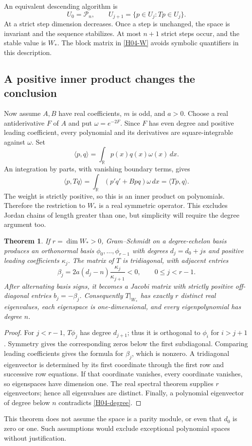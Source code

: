 \documentclass[11pt,a4paper]{article}
\newtheorem{theorem}{Theorem}[section]
\theoremstyle{definition}\newtheorem{definition}[theorem]{Definition}
\theoremstyle{remark}\newtheorem{remark}[theorem]{Remark}
\newcommand{\R}{\mathbb R}\newcommand{\C}{\mathbb C}\newcommand{\N}{\mathbb N}
\newcommand{\Pcal}{\mathcal P}\newcommand{\PP}{\mathcal P}\newcommand{\Pp}{\mathcal P}
\numberwithin{equation}{section}
\begin{document}
An equivalent descending algorithm is
\[U_0=\Pcal_n,\qquad U_{j+1}=\{p\in U_j:Tp\in U_j\}.\]
At a strict step dimension decreases. Once a step is unchanged, the space is invariant and the sequence stabilizes. At most $n+1$ strict steps occur, and the stable value is $W_*$. The block matrix in \eqref{H04-W} avoids symbolic quantifiers in this description.
\subsection{A positive inner product changes the conclusion}\label{H04-sec-3}
Now assume $A,B$ have real coefficients, $m$ is odd, and $a>0$. Choose a real antiderivative $F$ of $A$ and put $\omega=e^{-2F}$. Since $F$ has even degree and positive leading coefficient, every polynomial and its derivatives are square-integrable against $\omega$. Set
\[\langle p,q\rangle=\int_{\R}p(x)q(x)\omega(x)\,dx.\]
An integration by parts, with vanishing boundary terms, gives
\begin{equation}\label{H04-sym}
\langle p,Tq\rangle=\int_{\R}(p'q'+Bpq)\omega\,dx=\langle Tp,q\rangle.
\end{equation}
The weight is strictly positive, so this is an inner product on polynomials. Therefore the restriction to $W_*$ is a real symmetric operator. This excludes Jordan chains of length greater than one, but simplicity will require the degree argument too.
\begin{theorem}\label{H04-jac}
If $r=\dim W_*>0$, Gram--Schmidt on a degree-echelon basis produces an orthonormal basis $\phi_0,\ldots,\phi_{r-1}$ with degrees $d_j=d_0+js$ and positive leading coefficients $\kappa_j$. The matrix of $T$ is tridiagonal, with adjacent entries
\[\beta_j=2a(d_j-n)\frac{\kappa_j}{\kappa_{j+1}}<0,
\qquad 0\le j<r-1.\]
After alternating basis signs, it becomes a Jacobi matrix with strictly positive off-diagonal entries $b_j=-\beta_j$. Consequently $T|_{W_*}$ has exactly $r$ distinct real eigenvalues, each eigenspace is one-dimensional, and every eigenpolynomial has degree $n$.
\end{theorem}
\begin{proof}
For $j<r-1$, $T\phi_j$ has degree $d_{j+1}$; thus it is orthogonal to $\phi_i$ for $i>j+1$. Symmetry gives the corresponding zeros below the first subdiagonal. Comparing leading coefficients gives the formula for $\beta_j$, which is nonzero. A tridiagonal eigenvector is determined by its first coordinate through the first row and successive row equations. If that coordinate vanishes, every coordinate vanishes, so eigenspaces have dimension one. The real spectral theorem supplies $r$ eigenvectors; hence all eigenvalues are distinct. Finally, a polynomial eigenvector of degree below $n$ contradicts \eqref{H04-degree}.
\end{proof}
This theorem does not assume the space is a parity module, or even that $d_0$ is zero or one. Such assumptions would exclude exceptional polynomial spaces without justification.
\end{document}
